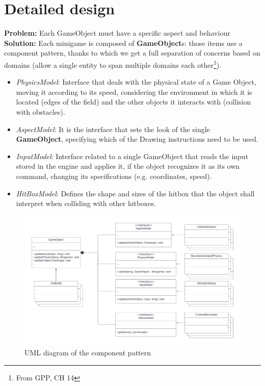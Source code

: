 \documentclass[a4paper,12pt]{report}
\begin{document}
\section{Detailed design}
\textbf{Problem:} Each GameObject must have a specific aspect and behaviour\\
\textbf{Solution:} Each minigame is composed of \textbf{GameObject}s: those items use a component pattern\cite{oop-game-prog-patterns-2022}, thanks to which we get
a full separation of concerns based on domains (allow a single entity to span multiple domains each other\footnote{From GPP, CH 14}).
\pagebreak
\begin{itemize}
	\item \textit{PhysicsModel}: Interface that deals with the physical state of a Game Object,
	      moving it according to its speed, considering the environment in which it is located (edges of the field)
	      and the other objects it interacts with (collision with obstacles).
	\item \textit{AspectModel}: It is the interface that sets the look of the single\\ \textbf{GameObject}, specifying which of the Drawing instructions need to be used.
	\item \textit{InputModel}: Interface related to a single GameObject that reads the input stored in the
	      engine and applies it, if the object recognizes it as its own command, changing its specifications (e.g. coordinates, speed).
	\item \textit{HitBoxModel}: Defines the shape and sizes of the hitbox that the object shall interpret when colliding with other hitboxes. \cite{Circle-Rectangle-collision-detection}
\end{itemize}

\begin{figure}[ht]
	\centering{}
	\includegraphics[width=\textwidth]{res/componentPattern.pdf}
	\caption{UML diagram of the component pattern}
\end{figure}
\end{document}
